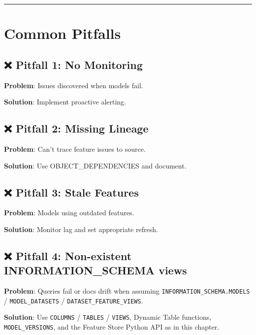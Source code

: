\documentclass[
  letterpaper,
  DIV=11,
  numbers=noendperiod]{scrreprt}
\begin{document}
\begin{center}\rule{0.5\linewidth}{0.5pt}\end{center}

\hypertarget{common-pitfalls-9}{%
\section{Common Pitfalls}\label{common-pitfalls-9}}

\hypertarget{pitfall-1-no-monitoring}{%
\subsection{❌ Pitfall 1: No Monitoring}\label{pitfall-1-no-monitoring}}

\textbf{Problem}: Issues discovered when models fail.

\textbf{Solution}: Implement proactive alerting.

\hypertarget{pitfall-2-missing-lineage}{%
\subsection{❌ Pitfall 2: Missing
Lineage}\label{pitfall-2-missing-lineage}}

\textbf{Problem}: Can't trace feature issues to source.

\textbf{Solution}: Use OBJECT\_DEPENDENCIES and document.

\hypertarget{pitfall-3-stale-features}{%
\subsection{❌ Pitfall 3: Stale
Features}\label{pitfall-3-stale-features}}

\textbf{Problem}: Models using outdated features.

\textbf{Solution}: Monitor lag and set appropriate refresh.

\hypertarget{pitfall-4-non-existent-information_schema-views}{%
\subsection{❌ Pitfall 4: Non-existent INFORMATION\_SCHEMA
views}\label{pitfall-4-non-existent-information_schema-views}}

\textbf{Problem}: Queries fail or docs drift when assuming
\texttt{INFORMATION\_SCHEMA.MODELS} / \texttt{MODEL\_DATASETS} /
\texttt{DATASET\_FEATURE\_VIEWS}.

\textbf{Solution}: Use \texttt{COLUMNS} / \texttt{TABLES} /
\texttt{VIEWS}, Dynamic Table functions, \texttt{MODEL\_VERSIONS}, and
the Feature Store Python API as in this chapter.
\end{document}
